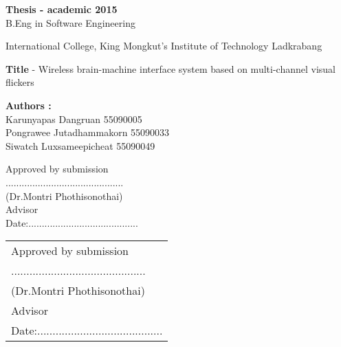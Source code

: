 \begin{approve}
\textbf{Thesis - academic 2015}\\
B.Eng in Software Engineering

International College, King Mongkut's Institute of Technology Ladkrabang


\textbf{Title} - Wireless brain-machine interface system based on multi-channel visual flickers

\textbf{Authors :}\\
Karunyapas  Dangruan  55090005\\
Pongrawee  Jutadhammakorn 55090033\\
Siwatch  Luxsameepicheat  55090049\\

\begin{flushright}
Approved by submission\\
............................................\\
(Dr.Montri Phothisonothai)\\
Advisor\\

Date:.........................................\\
\end{flushright}

\begin{tabu}{ P}
	
Approved by submission\\
............................................\\
(Dr.Montri Phothisonothai)\\
Advisor\\

Date:.........................................\\
\end{tabu}   


\end{approve}